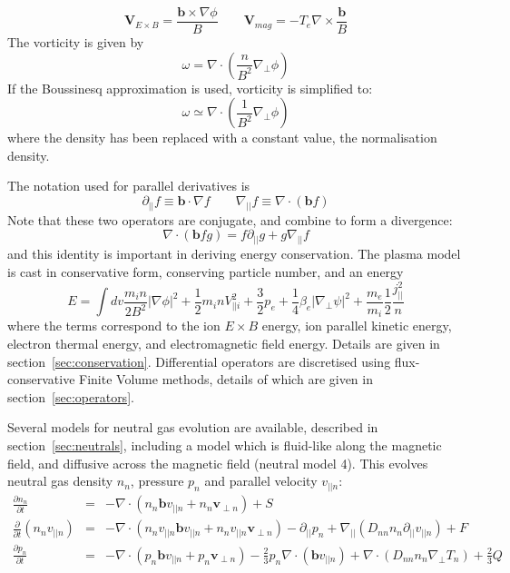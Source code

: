 \documentclass[12pt,a4paper]{article}
\begin{document}
\begin{equation}
\mathbf{V}_{E\times B} = \frac{\mathbf{b}\times\nabla \phi}{B} \qquad \mathbf{V}_{mag} = -T_e\nabla\times\frac{\mathbf{b}}{B}
\end{equation}
The vorticity is given by
\begin{equation}
\omega = \nabla\cdot\left(\frac{n}{B^2}\nabla_\perp \phi\right)
\end{equation}
If the Boussinesq approximation is used,  vorticity is simplified to:
\begin{equation}
\omega \simeq \nabla\cdot\left(\frac{1}{B^2}\nabla_\perp \phi\right)
\end{equation}
where the density has been replaced with a constant value, the normalisation density.

The notation used for parallel derivatives is
\begin{equation}
  \partial_{||} f \equiv \mathbf{b}\cdot\nabla f \qquad \nabla_{||} f \equiv \nabla\cdot\left(\mathbf{b} f\right)
\end{equation}
Note that these two operators are conjugate, and combine to form a divergence:
\[
\nabla\cdot\left(\mathbf{b}fg\right) = f\partial_{||} g + g \nabla_{||} f
\]
and this identity is important in deriving energy conservation.
The plasma model is cast in conservative form, conserving particle number, and an energy
\begin{equation}
E = \int dv \frac{m_in}{2B^2}\left|\nabla\phi\right|^2 + \frac{1}{2}m_inV_{||i}^2 + \frac{3}{2}p_e + \frac{1}{4}\beta_e\left|\nabla_\perp\psi\right|^2 + \frac{m_e}{m_i}\frac{1}{2}\frac{j_{||}^2}{n}
\end{equation}
where the terms correspond to the ion $E\times B$ energy, ion parallel kinetic energy, electron thermal energy, and electromagnetic field energy. Details are given in section~\ref{sec:conservation}. Differential operators are discretised using flux-conservative Finite Volume methods, details of which are given in section~\ref{sec:operators}. 

Several models for neutral gas evolution are available, described in section~\ref{sec:neutrals}, including a model which is fluid-like along the magnetic field, and diffusive across the magnetic field (neutral model 4). This evolves neutral gas density $n_n$, pressure $p_n$ and parallel velocity $v_{||n}$:
\begin{eqnarray}
  \frac{\partial n_n}{\partial t} &=& -\nabla\cdot\left(n_n\mathbf{b}v_{||n} + n_n\mathbf{v}_{\perp n}\right) + S\\
  \frac{\partial}{\partial t}\left(n_nv_{||n}\right) &=& -\nabla\cdot\left(n_nv_{||n} \mathbf{b}v_{||n} + n_nv_{||n}\mathbf{v}_{\perp n}\right) - \partial_{||}p_n + \nabla_{||}\left(D_{nn}n_n\partial_{||}v_{||n}\right) + F \\
  \frac{\partial p_n}{\partial t} &=& -\nabla\cdot\left(p_n\mathbf{b}v_{||n} + p_n\mathbf{v}_{\perp n}\right) - \frac{2}{3}p_n\nabla\cdot\left(\mathbf{b}v_{||n}\right) + \nabla\cdot\left(D_{nn}n_n\nabla_\perp T_n\right) + \frac{2}{3}Q
\end{eqnarray}
\end{document}
